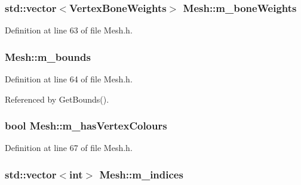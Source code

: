 \subsubsection[{\texorpdfstring{m\+\_\+bone\+Weights}{m_boneWeights}}]{\setlength{\rightskip}{0pt plus 5cm}std\+::vector$<${\bf Vertex\+Bone\+Weights}$>$ Mesh\+::m\+\_\+bone\+Weights\hspace{0.3cm}{\ttfamily [private]}}\hypertarget{class_mesh_af94a4a50f8aa0939d54a276db0a30405}{}\label{class_mesh_af94a4a50f8aa0939d54a276db0a30405}


Definition at line 63 of file Mesh.\+h.

\subsubsection[{\texorpdfstring{m\+\_\+bounds}{m_bounds}}]{ Mesh\+::m\+\_\+bounds\hspace{0.3cm}{\ttfamily [private]}}\hypertarget{class_mesh_ab93e9864474600467951b5cf2e4bbe86}{}\label{class_mesh_ab93e9864474600467951b5cf2e4bbe86}


Definition at line 64 of file Mesh.\+h.



Referenced by Get\+Bounds().

\subsubsection[{\texorpdfstring{m\+\_\+has\+Vertex\+Colours}{m_hasVertexColours}}]{\setlength{\rightskip}{0pt plus 5cm}bool Mesh\+::m\+\_\+has\+Vertex\+Colours\hspace{0.3cm}{\ttfamily [private]}}\hypertarget{class_mesh_a8ca68e64d0d562167d90cc2eb668d948}{}\label{class_mesh_a8ca68e64d0d562167d90cc2eb668d948}


Definition at line 67 of file Mesh.\+h.

\subsubsection[{\texorpdfstring{m\+\_\+indices}{m_indices}}]{\setlength{\rightskip}{0pt plus 5cm}std\+::vector$<$int$>$ Mesh\+::m\+\_\+indices\hspace{0.3cm}{\ttfamily [private]}}\hypertarget{class_mesh_ac2dfc2ca50bea355e2a5425cbb0a5aa8}{}\label{class_mesh_ac2dfc2ca50bea355e2a5425cbb0a5aa8}


